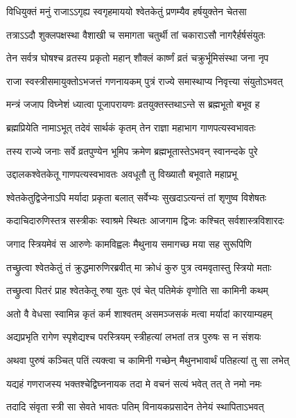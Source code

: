 \twolineshloka
{विधियुक्तं मनुं राजाऽऽगृह्य स्वगृहमाययो}
{श्वेतकेतुं प्रणम्यैव हर्षयुक्तेन चेतसा} %

\twolineshloka
{तत्राऽऽदौ शुक्लपक्षस्था वैशाखी च समागता}
{चतुर्थी तां चकाराऽसौ नागरैर्हर्षसंयुतः} %

\twolineshloka
{तेन सर्वत्र घोषश्च व्रतस्य प्रकृतो महान्}
{शौक्लं कार्ष्णं व्रतं चक्रुर्भूमिसंस्था जना नृप} %

\twolineshloka
{राजा स्वस्त्रीसमायुक्तोऽभजत्तं गणनायकम्}
{पुत्रं राज्ये समास्थाप्य निवृत्त्या संयुतोऽभवत्} %

\twolineshloka
{मन्त्रं जजाप विघ्नेशं ध्यात्वा पूजापरायणः}
{व्रतयुक्तस्तथाऽन्ते स ब्रह्मभूतो बभूव ह} %

\twolineshloka
{ब्रह्मप्रियेति नामाऽभूत् तदेवं सार्थकं कृतम्}
{तेन राज्ञा महाभाग गाणपत्यस्वभावतः} %

\twolineshloka
{तस्य राज्ये जनाः सर्वे व्रतपुण्येन भूमिप}
{क्रमेण ब्रह्मभूतास्तेऽभवन् स्वानन्दके पुरे} %

\twolineshloka
{उद्दालकश्वेतकेतू गाणपत्यस्वभावतः}
{अवधूतौ तु विख्यातौ बभूवाते महाप्रभू} %

\twolineshloka
{श्वेतकेतुद्विजेनाऽपि मर्यादा प्रकृता बलात्}
{सर्वेभ्यः सुखदाऽत्यन्तं तां श‍ृणुष्व विशेषतः} %

\twolineshloka
{कदाचिदारुणिस्तत्र सस्त्रीकः स्वाश्रमे स्थितः}
{आजगाम द्विजः कश्चित् सर्वशास्त्रविशारदः} %

\twolineshloka
{जगाद स्त्रियमेवं स आरुणेः कामविह्वलः}
{मैथुनाय समागच्छ मया सह सुरूपिणि} %

\twolineshloka
{तच्छ्रुत्वा श्वेतकेतुं तं क्रुद्धमारुणिरब्रवीत्}
{मा क्रोधं कुरु पुत्र त्वमवृतास्तु स्त्रियो मताः} %

\twolineshloka
{तच्छ्रुत्वा पितरं प्राह श्वेतकेतू रुषा युतः}
{एवं चेत् पतिमेकं वृणोति सा कामिनी कथम्} %

\twolineshloka
{अतो वै वेधसा स्वामिन्न कृतं कर्म शाश्वतम्}
{असमञ्जसकं मत्वा मर्यादां कारयाम्यहम्} %

\twolineshloka
{अद्यप्रभृति रागेण स्पृशेद्यश्च परस्त्रियम्}
{स्त्रीहत्यां लभतां तत्र पुरुषः स न संशयः} %

\twolineshloka
{अथवा पुरुषं कञ्चित् पतिं त्यक्त्वा च कामिनी}
{गच्छेन् मैथुनभावार्थं पतिहत्यां तु सा लभेत्} %

\twolineshloka
{यद्यहं गणराजस्य भक्तश्चेद्विघ्ननायक}
{तदा मे वचनं सत्यं भवेत् तत् ते नमो नमः} %

\twolineshloka
{तदादि संवृता स्त्री सा सेवते भावतः पतिम्}
{विनायकप्रसादेन तेनेयं स्थापिताऽभवत्} %

